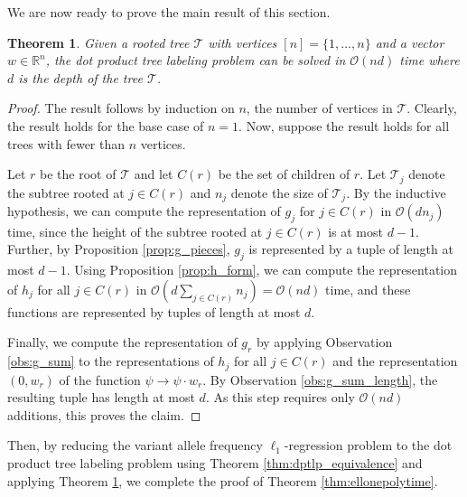 \documentclass[10pt]{article}
\newtheorem{theorem}{Theorem}
\newcommand{\tree}{\mathcal{T}}
\begin{document}
We are now ready to prove the main result of this section.
\begin{theorem}
    \label{thm:dptlp_polytime}
    Given a rooted tree $\tree$ with vertices $[n] = \{1, \ldots, n\}$ and a vector $w \in \mathbb{R}^n$, the 
    dot product tree labeling problem can be solved in $\mathcal{O}(nd)$ time where $d$ is the depth of the tree $\tree$.
\end{theorem}
\begin{proof}
    The result follows by induction on $n$, the number of vertices in $\tree$. Clearly, the result holds for the base
    case of $n = 1$. Now, suppose the result holds for all trees with fewer than $n$ vertices.

    Let $r$ be the root of $\tree$ and let $C(r)$ be the set of children of $r$. Let $\tree_j$ denote the subtree rooted at
    $j \in C(r)$ and $n_j$ denote the size of $\tree_j$. By the inductive hypothesis, we can compute
    the representation of $g_j$ for $j \in C(r)$ in $\mathcal{O}(dn_j)$ time, since the height of the subtree rooted at 
    $j \in C(r)$ is at most $d - 1$. Further, by Proposition \ref{prop:g_pieces}, $g_j$ is represented by a 
    tuple of length at most $d - 1$. Using Proposition \ref{prop:h_form}, we can compute the representation of $h_j$ for all
    $j \in C(r)$ in $\mathcal{O}(d\sum_{j\in C(r)}n_j) = \mathcal{O}(nd)$ time, and these functions are represented by tuples of length at most $d$.

    Finally, we compute the representation of $g_r$ by applying Observation \ref{obs:g_sum} to the representations of 
    $h_j$ for all $j \in C(r)$ and the representation $(0, w_r)$ of the function $\psi \rightarrow \psi\cdot w_r$. 
    By Observation \ref{obs:g_sum_length}, the resulting tuple has 
    length at most $d$. As this step requires only $\mathcal{O}(nd)$ additions, this proves the claim.
\end{proof}

Then, by reducing the variant allele frequency $\ell_1$-regression problem to the dot product
tree labeling problem using Theorem \ref{thm:dptlp_equivalence} and applying Theorem \ref{thm:dptlp_polytime}, 
we complete the proof of Theorem \ref{thm:ellonepolytime}.
\end{document}
